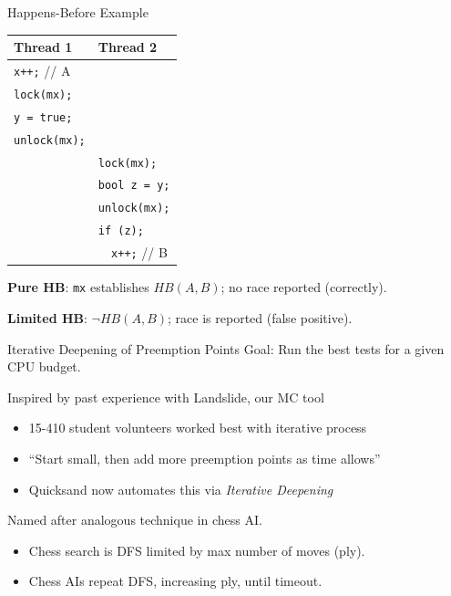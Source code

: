 \documentclass[xcolor=dvipsnames]{beamer}
\begin{document}
\begin{frame}{Happens-Before Example}
	\begin{center}
		\begin{tabular}{|l|l|}
			\hline
			\cellcolor{thread1} {\bf Thread 1} & \cellcolor{thread2} {\bf Thread 2} \\
			\hline
			\small \texttt{x++;} // A & \\
			\small \texttt{lock(mx);} & \\
			\small \texttt{y = true;} & \\
			\small \texttt{unlock(mx);} & \\
			
			& \small \texttt{lock(mx);} \\
			& \small \texttt{bool z = y;} \\
			& \small \texttt{unlock(mx);} \\
			& \small \texttt{if (z);} \\
			& \small \texttt{~~x++;} // B \\
			\hline
		\end{tabular}
	\end{center}
	{\bf Pure HB}: \texttt{mx} establishes $HB(A, B)$; no race reported (correctly).
	\linegap

	{\bf Limited HB}: $\neg HB(A, B)$; race is reported (false positive).
\end{frame}



\begin{frame}{Iterative Deepening of Preemption Points}
	Goal: Run the best tests for a given CPU budget.
	\linegap

	Inspired by past experience with Landslide, our MC tool
	\begin{itemize}
		\item 15-410 student volunteers worked best with iterative process
		\item ``Start small, then add more preemption points as time allows''
		\item Quicksand now automates this via {\em Iterative Deepening}
	\end{itemize}
	\linegap

	Named after analogous technique in chess AI.
	\begin{itemize}
		\item Chess search is DFS limited by max number of moves (ply).
		\item Chess AIs repeat DFS, increasing ply, until timeout.
	\end{itemize}
\end{frame}
\end{document}
